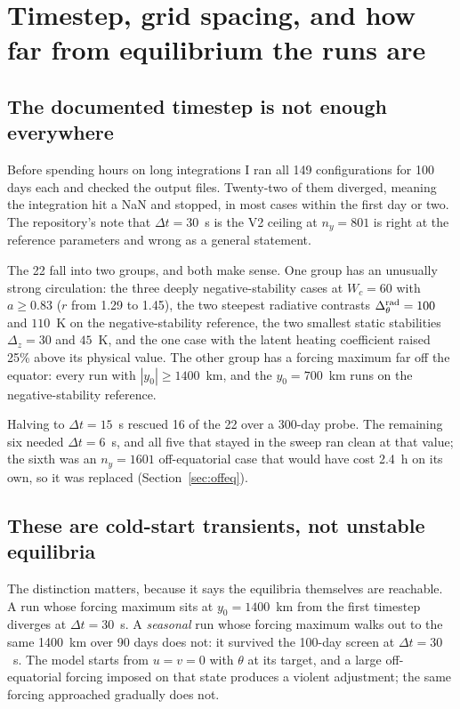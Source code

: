 \documentclass[11pt]{article}
\newcommand{\dyr}{\Delta_\theta^{\rm rad}}
\begin{document}
\section{Timestep, grid spacing, and how far from equilibrium the runs are}
\label{sec:numerics}

\subsection{The documented timestep is not enough everywhere}

Before spending hours on long integrations I ran all 149 configurations for 100
days each and checked the output files. Twenty-two of them diverged, meaning the
integration hit a NaN and stopped, in most cases within the first day or two.
The repository's note that $\Delta t = 30$~s is the V2 ceiling at $n_y = 801$ is
right at the reference parameters and wrong as a general statement.

The 22 fall into two groups, and both make sense. One group has an unusually
strong circulation: the three deeply negative-stability cases at $W_c = 60$ with
$a \ge 0.83$ ($r$ from 1.29 to 1.45), the two steepest radiative contrasts
$\dyr = 100$ and $110$~K on the negative-stability reference, the two smallest
static stabilities $\Delta_z = 30$ and $45$~K, and the one case with the latent
heating coefficient raised 25\% above its physical value. The other group has a
forcing maximum far off the equator: every run with $|y_0| \ge 1400$~km, and the
$y_0 = 700$~km runs on the negative-stability reference.

Halving to $\Delta t = 15$~s rescued 16 of the 22 over a 300-day probe. The
remaining six needed $\Delta t = 6$~s, and all five that stayed in the sweep ran
clean at that value; the sixth was an $n_y = 1601$ off-equatorial case that would
have cost 2.4~h on its own, so it was replaced (Section~\ref{sec:offeq}).

\subsection{These are cold-start transients, not unstable equilibria}

The distinction matters, because it says the equilibria themselves are
reachable. A run whose forcing maximum sits at $y_0 = 1400$~km from the first
timestep diverges at $\Delta t = 30$~s. A \emph{seasonal} run whose forcing
maximum walks out to the same 1400~km over 90 days does not: it survived the
100-day screen at $\Delta t = 30$~s. The model starts from $u = v = 0$ with
$\theta$ at its target, and a large off-equatorial forcing imposed on that state
produces a violent adjustment; the same forcing approached gradually does not.
\end{document}
